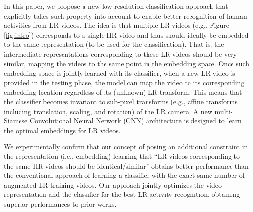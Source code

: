 \documentclass[letterpaper]{article} %
\begin{document}
In this paper, we propose a new low resolution classification approach that explicitly takes such property into account to enable better recognition of human activities from LR videos. The idea is that multiple LR videos (e.g., Figure \ref{fig:intro}) corresponds to a single HR video and thus should ideally be embedded to the same representation (to be used for the classification). That is, the intermediate representations corresponding to these LR videos should be very similar, mapping the videos to the same point in the embedding space. %
Once such embedding space is jointly learned with its classifier, when a new LR video is provided in the testing phase, the model can map the video to its corresponding embedding location regardless of its (unknown) LR transform. This means that the classifier becomes invariant to sub-pixel transforms (e.g., affine transforms including translation, scaling, and rotation) of the LR camera. A new multi-Siamese Convolutional Neural Network (CNN) architecture is designed to learn the optimal embeddings for LR videos.



We experimentally confirm that our concept of posing an additional constraint in the representation (i.e., embedding) learning that ``LR videos corresponding to the same HR videos should be identical/similar'' obtains better performance than the conventional approach of learning a classifier with the exact same number of augmented LR training videos. Our approach jointly optimizes the video representation and the classifier for the best LR activity recognition, obtaining superior performances to prior works.
\end{document}
